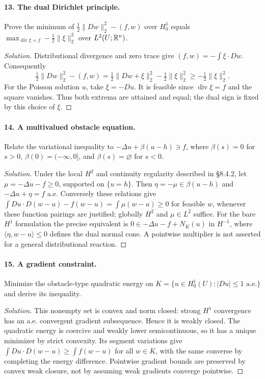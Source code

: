 \Needspace{30mm}
\paragraph{13. The dual Dirichlet principle.}
Prove the minimum of $\frac12\|Dw\|_2^2-(f,w)$ over $H^1_0$ equals
$\max_{\operatorname{div}\xi=f}-\frac12\|\xi\|_2^2$ over $L^2(U;\mathbb{R}^n)$.
\begin{proof}[Solution]
Distributional divergence and zero trace give $(f,w)=-\int\xi\cdot Dw$.
Consequently
\[
 \tfrac12\|Dw\|_2^2-(f,w)
 =\tfrac12\|Dw+\xi\|_2^2-\tfrac12\|\xi\|_2^2
 \geq-\tfrac12\|\xi\|_2^2.
\]
For the Poisson solution $u$, take $\xi=-Du$. It is feasible since
$\operatorname{div}\xi=f$ and the square vanishes. Thus both extrema
are attained and equal; the dual sign is fixed by this choice of $\xi$.
\end{proof}
\Needspace{55mm}

\Needspace{30mm}
\paragraph{14. A multivalued obstacle equation.}
Relate the variational inequality to $-\Delta u+\beta(u-h)\ni f$, where
$\beta(s)=0$ for $s>0$, $\beta(0)=(-\infty,0]$, and $\beta(s)=\varnothing$ for $s<0$.
\begin{proof}[Solution]
Under the local $H^2$ and continuity regularity described in \S8.4.2,
let $\mu=-\Delta u-f\geq0$, supported on $\{u=h\}$.
Then $\eta=-\mu\in\beta(u-h)$ and $-\Delta u+\eta=f$ a.e.
Conversely these relations give
$\int Du\cdot D(w-u)-f(w-u)=\int\mu(w-u)\geq0$ for feasible $w$,
whenever these function pairings are justified; globally $H^2$ and
$\mu\in L^2$ suffice. For the bare $H^1$ formulation the precise equivalent
is $0\in -\Delta u-f+N_K(u)$ in $H^{-1}$, where
$\langle\eta,w-u\rangle\leq0$ defines the dual normal cone.
A pointwise multiplier is not asserted for a general distributional reaction.
\end{proof}

\Needspace{30mm}
\paragraph{15. A gradient constraint.}
Minimize the obstacle-type quadratic energy on
$K=\{u\in H^1_0(U):|Du|\leq1\text{ a.e.}\}$ and derive its inequality.
\begin{proof}[Solution]
This nonempty set is convex and norm closed: strong $H^1$ convergence
has an a.e. convergent gradient subsequence. Hence it is weakly closed.
The quadratic energy is coercive and weakly lower semicontinuous, so it
has a unique minimizer by strict convexity. Its segment variations give
$\int Du\cdot D(w-u)\geq\int f(w-u)$ for all $w\in K$,
with the same converse by completing the energy difference.
Pointwise gradient bounds are preserved by convex weak closure, not by
assuming weak gradients converge pointwise.
\end{proof}

